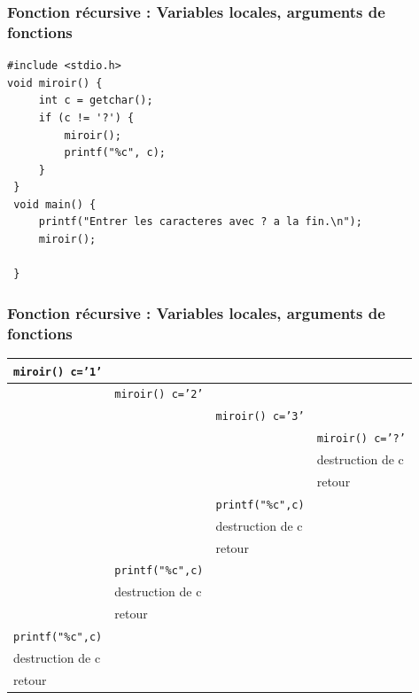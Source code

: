 \documentclass{beamer}
\begin{document}
\begin{frame}[fragile]
\frametitle{Fonction récursive : Variables locales, arguments de fonctions}
 
\begin{verbatim}
#include <stdio.h> 
void miroir() { 
     int c = getchar(); 
     if (c != '?') { 
         miroir(); 
         printf("%c", c);        
     }    
 } 
 void main() { 
     printf("Entrer les caracteres avec ? a la fin.\n"); 
     miroir(); 
     
 }
\end{verbatim}

\end{frame}

\begin{frame}[fragile]
\frametitle{Fonction récursive : Variables locales, arguments de fonctions}
 
\begin{tabular}{|l|l|l|l|}\hline 
{\tt miroir() c='1'} & & & \\
\hline
 & {\tt miroir() c='2'} & & \\
\hline
& & {\tt miroir() c='3'} &  \\
\hline
& & & {\tt miroir() c='?'}   \\
\hline
& & & destruction de c  \\
& & & retour  \\
\hline
& & {\tt printf("\%c",c)}   &  \\
\hline 
& & destruction de c & \\
& & retour  & \\
\hline
& {\tt printf("\%c",c)}   &  &\\
\hline 
 & destruction de c & & \\
& retour  & &\\
\hline
 {\tt printf("\%c",c)}   & & &\\
\hline 
 destruction de c & & &\\
retour  & &&\\
\hline
\end{tabular}
\end{frame}
\end{document}

